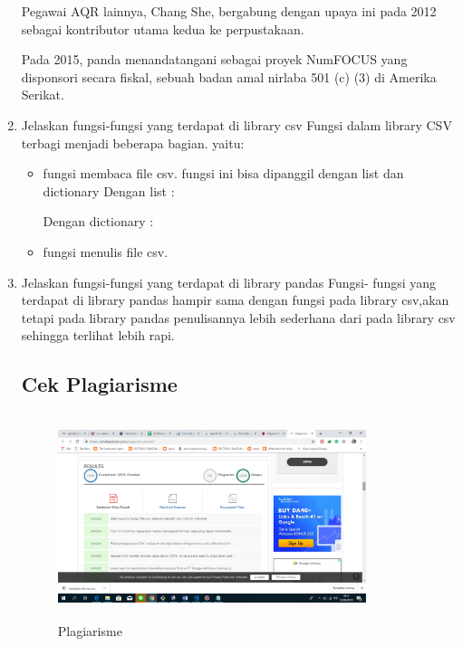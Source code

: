 \begin{enumerate}
Pegawai AQR lainnya, Chang She, bergabung dengan upaya ini pada 2012 sebagai kontributor utama kedua ke perpustakaan.

Pada 2015, panda menandatangani sebagai proyek NumFOCUS yang disponsori secara fiskal, sebuah badan amal nirlaba 501 (c) (3) di Amerika Serikat.
	
	
	\item Jelaskan fungsi-fungsi yang terdapat di library csv
 	Fungsi dalam library CSV terbagi menjadi beberapa bagian. yaitu:
	\begin{itemize}
	\item fungsi membaca file csv.
    	fungsi ini bisa dipanggil dengan list dan dictionary
    	Dengan list :
    	
    	Dengan dictionary :
    	
   	 \item fungsi menulis file csv.
    	
	\end{itemize}

	\item Jelaskan fungsi-fungsi yang terdapat di library pandas
	Fungsi- fungsi yang terdapat di library pandas hampir sama dengan fungsi pada library csv,akan tetapi pada library pandas penulisannya lebih sederhana dari pada library csv sehingga terlihat lebih rapi.
    	

\subsection{Cek Plagiarisme}
\begin{figure}[!htbp]
	\centering
	\includegraphics[width=9cm,height=6cm]{figures/nico/Chapter4/plagiarisme.png}
	\caption{Plagiarisme}
	\label{plagiarisme}
\end{figure}
	
\end{enumerate}


